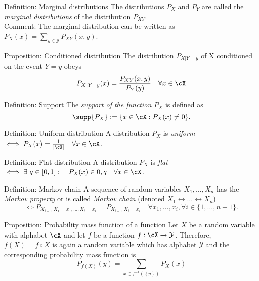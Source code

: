 \documentclass[
			print,
			a6paper,
			grid=none]{kartei}
\begin{document}
\begin{karte}{Definition: Marginal distributions}
	The distributions $P_X$ and $P_Y$ are called the \emph{marginal distributions} of the distribution $P_{XY}$. \\
	Comment: The marginal distribution can be written as $P_X (x) = \sum_{y\in\mathcal{Y}} P_{XY}(x,y)$.
\end{karte}

\begin{karte}{Proposition: Conditioned distribution}
	The distribution $P_{X\vert Y=y}$ of X conditioned on the event $Y=y$ obeys
	\begin{equation*}
		P_{X\vert Y=y}(x) = \frac{P_{XY}(x,y)}{P_Y(y)} 	\quad	\forall x\in\cX
	\end{equation*}
\end{karte}

\begin{karte}{Definition: Support}
	The \emph{support of the function $P_X$} is defined as 
	\begin{equation*}
		\supp{P_X}:=\{x\in\cX :P_X(x)\neq 0\}.
	\end{equation*}
\end{karte}

\begin{karte}{Definition: Uniform distribution}
	A distribution $P_X$ is \emph{uniform} $\iff P_X(x)=\frac{1}{\lvert\cX\rvert}	\quad	\forall x\in\cX$.
\end{karte}

\begin{karte}{Definition: Flat distribution}
	A distribution $P_X$ is \emph{flat} $\iff \exists~ q\in[0,1]:\quad P_X(x)\in{0,q}	\quad	\forall x\in\cX$.
\end{karte}

\begin{karte}{Definition: Markov chain}
	A sequence of random variables $X_1,\ldots,X_n$ has the \emph{Markov property} or is called \emph{Markov chain} (denoted $X_1\leftrightarrow\ldots\leftrightarrow X_n$)
	\begin{equation*}
		\iff P_{X_{i+1}\vert X_1=x_1,\ldots,X_i=x_i} = P_{X_{i+1}\vert X_i=x_i} \quad	\forall x_1,\ldots, x_i, \forall i\in\{1,\dots,n-1\}.
	\end{equation*}
\end{karte}

\begin{karte}{Proposition: Probability mass function of a function}
	Let $X$ be a random variable with alphabet $\cX$ and let $f$ be a function $f:\cX\to\mathcal{Y}$. Therefore, $f(X)=f\circ X$ is again a random variable which has alphabet $\mathcal{Y}$ and the corresponding probability mass function is 
	\begin{equation*}
		P_{f(X)}(y) = \sum_{x\in f^{-1}(\left\{ y \right\})} P_X(x)
	\end{equation*}
\end{karte}
\end{document}
